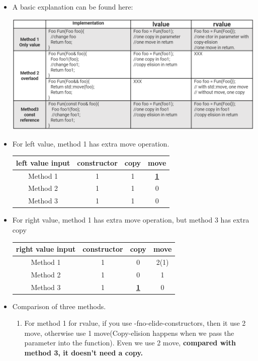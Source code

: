 \documentclass[a4paper,11pt,twoside]{book}
\begin{document}
\begin{itemize}
\item A basic explanation can be found here: \\
\begin{center}
	\includegraphics[scale=0.5]{pics/copy1.png}
\end{center}

\item For left value, method 1 has extra move operation.

\begin{tabular}{|c|c|c|c|}
	\hline
	left value input	& constructor & copy & move  \\
	\hline
	Method 1 & 1 & 1 & \textbf{\underline{1}} \\
	\hline
	Method 2&  1& 1 & 0  \\
	\hline
	Method 3&  1&  1& 0 \\
	\hline
\end{tabular}

\item For right value, method 1 has extra move operation, but method 3 has extra copy

\begin{tabular}{|c|c|c|c|}
	\hline
	right value input	& constructor & copy & move  \\
	\hline
	Method 1 & 1 & 0 & 2(1)  \\
	\hline
	Method 2 & 1 & 0 & 1 \\
	\hline
	Method 3 & 1 & \textbf{\underline{1}} & 0 \\
	\hline
\end{tabular}


\item Comparison of three methods. 
\begin{enumerate}
	\item For method 1 for rvalue,  if you use -fno-elide-constructors, then it use 2 move, otherwise use 1 move(Copy-elision happens when we pass the parameter into the function). Even we use 2 move, \textbf{compared with method 3, it doesn't need a copy.}
	

\end{enumerate}
\end{itemize}
\end{document}
